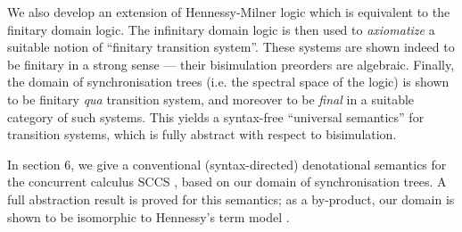 We also develop an extension of Hennessy-Milner logic which is equivalent to the finitary domain logic.
The infinitary domain logic is then used to {\em axiomatize} a suitable notion of ``finitary transition system''.
These systems are shown indeed to be finitary in a strong sense --- their bisimulation preorders are algebraic.
Finally, the domain of synchronisation trees (i.e. the spectral space of the logic) is shown to be finitary {\it qua} transition system, and moreover to be {\em final} in a suitable category of such systems.
This yields a syntax-free ``universal semantics'' for transition systems, which is fully abstract with respect to bisimulation.

In section 6, we give a conventional (syntax-directed) denotational semantics for the concurrent calculus SCCS \cite{Mil83}, based on our domain of synchronisation trees.
A full abstraction result is proved for this semantics; as a by-product, our domain is shown to be isomorphic to Hennessy's term model \cite{Hen81}.
